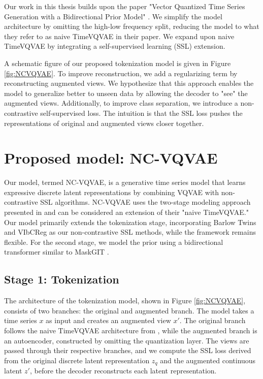 \documentclass[../../thesis.tex]{subfiles}
\begin{document}
Our work in this thesis builds upon the paper "Vector Quantized Time Series Generation with a Bidirectional Prior Model" \cite{TimeVQVAE}. We simplify the model architecture by omitting the high-low frequency split, reducing the model to what they refer to as naive TimeVQVAE in their paper. We expand upon naive TimeVQVAE by integrating a self-supervised learning (SSL) extension. \newline

A schematic figure of our proposed tokenization model is given in Figure \ref{fig:NCVQVAE}. To improve reconstruction, we add a regularizing term by reconstructing augmented views. We hypothesize that this approach enables the model to generalize better to unseen data by allowing the decoder to "see" the augmented views. Additionally, to improve class separation, we introduce a non-contrastive self-supervised loss. The intuition is that the SSL loss pushes the representations of original and augmented views closer together.\newline

\section{Proposed model: NC-VQVAE}

Our model, termed NC-VQVAE, is a generative time series model that learns expressive discrete latent representations by combining VQVAE \cite{VQVAE} with non-contrastive SSL algorithms. NC-VQVAE uses the two-stage modeling approach presented in \cite{TimeVQVAE} and can be considered an extension of their "naive TimeVQVAE." Our model primarily extends the tokenization stage, incorporating Barlow Twins \cite{zbontar2021barlow} and VIbCReg \cite{lee2024computer} as our non-contrastive SSL methods, while the framework remains flexible. For the second stage, we model the prior using a bidirectional transformer similar to MaskGIT \cite{chang2022maskgit}.

\subsection{Stage 1: Tokenization}

The architecture of the tokenization model, shown in Figure \ref{fig:NCVQVAE}, consists of two branches: the original and augmented branch. The model takes a time series $x$ as input and creates an augmented view $x'$. The original branch follows the naive TimeVQVAE architecture from \cite{TimeVQVAE}, while the augmented branch is an autoencoder, constructed by omitting the quantization layer. The views are passed through their respective branches, and we compute the SSL loss derived from the original discrete latent representation $z_q$ and the augmented continuous latent $z'$, before the decoder reconstructs each latent representation. \newline 
\end{document}
